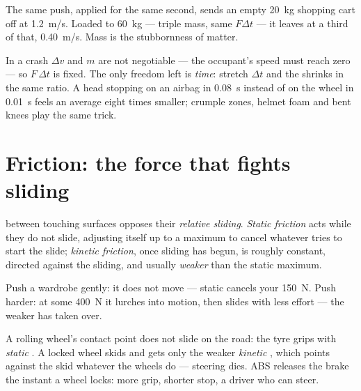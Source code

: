 \begin{example}\label{ex:g11:forces-and-motion:cart}
The same push, applied for the same second, sends an empty
\qty{20}{kg} shopping cart off at \qty{1.2}{m/s}. Loaded to
\qty{60}{kg} --- triple mass, same $F\Delta t$ --- it leaves at a
third of that, \qty{0.40}{m/s}. Mass is the stubbornness of matter.
\end{example}

\begin{remark}\label{rem:g11:forces-and-motion:airbag}
In a crash $\Delta v$ and $m$ are not negotiable --- the occupant's
speed must reach zero --- so $F\,\Delta t$ is fixed. The only freedom
left is \emph{time}: stretch $\Delta t$ and the  shrinks in the
same ratio. A head stopping on an airbag in \qty{0.08}{s} instead of on
the wheel in \qty{0.01}{s} feels an average  eight times smaller;
crumple zones, helmet foam and bent knees play the same trick.
\end{remark}

\section{Friction: the force that fights sliding}

\begin{definition}\label{def:g11:forces-and-motion:friction}
 between touching surfaces opposes their \emph{relative
sliding}. \emph{Static friction} acts while they
do not slide, adjusting itself up to a maximum to cancel whatever tries
to start the slide; \emph{kinetic friction},
once sliding has begun, is roughly constant, directed against the
sliding, and usually \emph{weaker} than the static maximum.
\end{definition}

\begin{example}\label{ex:g11:forces-and-motion:wardrobe}
Push a wardrobe gently: it does not move --- static  cancels
your \qty{150}{N}. Push harder: at some \qty{400}{N} it lurches into
motion, then slides with less effort --- the weaker 
has taken over.
\end{example}

\begin{remark}\label{rem:g11:forces-and-motion:abs}
A rolling wheel's contact point does not slide on the road: the tyre
grips with \emph{static} . A locked wheel skids and gets only
the weaker \emph{kinetic} , which points against the skid
whatever the wheels do --- steering dies. ABS releases the brake the
instant a wheel locks: more grip, shorter stop, a driver who can steer.
\end{remark}

